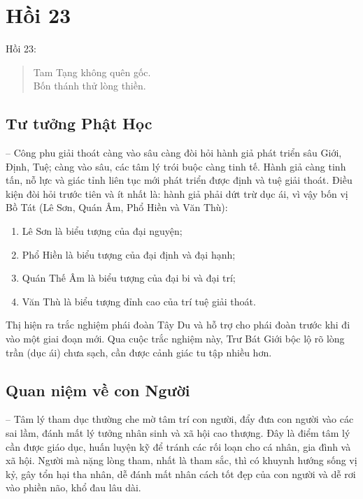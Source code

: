 \chapter{Hồi 23} %
\label{cha:hoi_23}

Hồi 23:

\begin{verse}
\begin{itshape}
Tam Tạng không quên gốc.\\
Bốn thánh thử lòng thiền.
\end{itshape}
\end{verse}

\section{Tư tưởng Phật Học} %
\label{sec:23_phat_hoc}

-- Công phu giải thoát càng vào sâu càng đòi hỏi hành giả phát triển sâu Giới, Định, Tuệ; càng vào sâu, các tâm lý trói buộc càng tinh tế. Hành giả càng tinh tấn, nỗ lực và giác tỉnh liên tục mới phát triển được định và tuệ giải thoát. Điều kiện đòi hỏi trước tiên và ít nhất là: hành giả phải dứt trừ dục ái, vì vậy bốn vị Bồ Tát (Lê Sơn, Quán Âm, Phổ Hiền và Văn Thù):

\begin{enumerate}[label=\itshape\arabic*\upshape/]
   \item Lê Sơn là biểu tượng của đại nguyện;

   \item Phổ Hiền là biểu tượng của đại định và đại hạnh;

   \item Quán Thế Âm là biểu tượng của đại bi và đại trí;

   \item Văn Thù là biểu tượng đỉnh cao của trí tuệ giải thoát.
\end{enumerate}

Thị hiện ra trắc nghiệm phái đoàn Tây Du và hỗ trợ cho phái đoàn trước khi đi vào một giai đoạn mới. Qua cuộc trắc nghiệm này, Trư Bát Giới bộc lộ rõ lòng trần (dục ái) chưa sạch, cần được cảnh giác tu tập nhiều hơn.

\section{Quan niệm về con Người} %
\label{sec:23_con_nguoi}

-- Tâm lý tham dục thường che mờ tâm trí con người, đẩy đưa con người vào các sai lầm, đánh mất lý tưởng nhân sinh và xã hội cao thượng. Đây là điểm tâm lý cần được giáo dục, huấn luyện kỹ để tránh các rối loạn cho cá nhân, gia đình và xã hội. Người mà nặng lòng tham, nhất là tham sắc, thì có khuynh hướng sống vị kỷ, gây tổn hại tha nhân, dễ đánh mất nhân cách tốt đẹp của con người và dễ rơi vào phiền não, khổ đau lâu dài.

